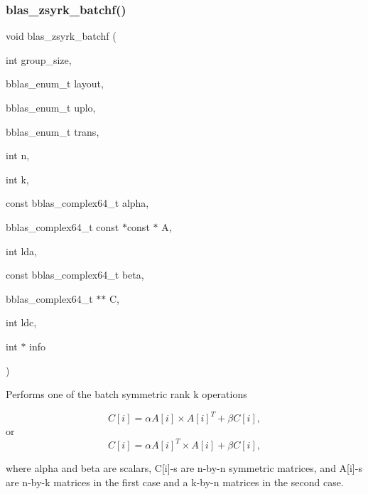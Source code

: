 \subsubsection{\texorpdfstring{blas\+\_\+zsyrk\+\_\+batchf()}{blas\_zsyrk\_batchf()}}
{\footnotesize\ttfamily void blas\+\_\+zsyrk\+\_\+batchf (\begin{DoxyParamCaption}\item[{int}]{group\+\_\+size,  }\item[{bblas\+\_\+enum\+\_\+t}]{layout,  }\item[{bblas\+\_\+enum\+\_\+t}]{uplo,  }\item[{bblas\+\_\+enum\+\_\+t}]{trans,  }\item[{int}]{n,  }\item[{int}]{k,  }\item[{const bblas\+\_\+complex64\+\_\+t}]{alpha,  }\item[{bblas\+\_\+complex64\+\_\+t const $\ast$const $\ast$}]{A,  }\item[{int}]{lda,  }\item[{const bblas\+\_\+complex64\+\_\+t}]{beta,  }\item[{bblas\+\_\+complex64\+\_\+t $\ast$$\ast$}]{C,  }\item[{int}]{ldc,  }\item[{int $\ast$}]{info }\end{DoxyParamCaption})}

Performs one of the batch symmetric rank k operations

\[ C[i] = \alpha A[i] \times A[i]^T + \beta C[i], \] or \[ C[i] = \alpha A[i]^T \times A[i] + \beta C[i], \]

where alpha and beta are scalars, C\mbox{[}i\mbox{]}-\/s are n-\/by-\/n symmetric matrices, and A\mbox{[}i\mbox{]}-\/s are n-\/by-\/k matrices in the first case and a k-\/by-\/n matrices in the second case.


